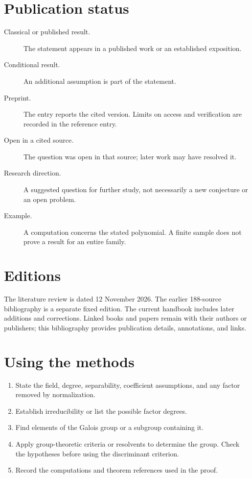 \documentclass[11pt,a4paper,oneside,openany]{book}
\begin{document}
\section*{Publication status}
\begin{description}
\item[Classical or published result.] The statement appears in a published work or an established exposition.
\item[Conditional result.] An additional assumption is part of the statement.
\item[Preprint.] The entry reports the cited version. Limits on access and verification are recorded in the reference entry.
\item[Open in a cited source.] The question was open in that source; later work may have resolved it.
\item[Research direction.] A suggested question for further study, not necessarily a new conjecture or an open problem.
\item[Example.] A computation concerns the stated polynomial. A finite sample does not prove a result for an entire family.
\end{description}

\section*{Editions}
The literature review is dated 12 November 2026. The earlier 188-source bibliography is a separate fixed edition. The current handbook includes later additions and corrections. Linked books and papers remain with their authors or publishers; this bibliography provides publication details, annotations, and links.

\section*{Using the methods}
\begin{enumerate}
\item State the field, degree, separability, coefficient assumptions, and any factor removed by normalization.
\item Establish irreducibility or list the possible factor degrees.
\item Find elements of the Galois group or a subgroup containing it.
\item Apply group-theoretic criteria or resolvents to determine the group. Check the hypotheses before using the discriminant criterion.
\item Record the computations and theorem references used in the proof.
\end{enumerate}
\end{document}
